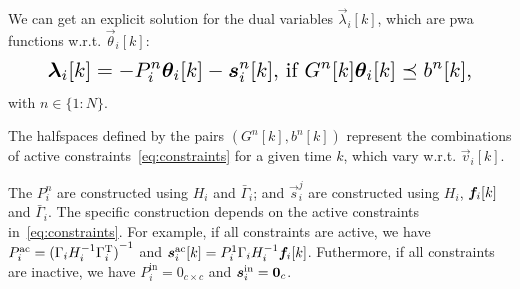 \documentclass{ifacconf}  %
\begin{document}
We can get an explicit solution for the dual variables $\vec{\lambda}_{i}[k]$, which are \acrfull{pwa} functions w.r.t. $\vec{\theta}_{i}[k]$:
\begin{equation}
\resizebox{.88\columnwidth}{!}{$
  \begin{aligned}\label{eq:lambdafuntheta}
    \lambdaik=
      -P_{i}^{n}\thetaik-\vec{s}_{i}^{n}[k]\text{, if}\ G^{n}[k]\thetaik \preceq b^{n}[k],
  \end{aligned}
  $}
\end{equation}
with $n\in\{1\mathbin{:}N\}$.

The halfspaces defined by the pairs $(G^{n}[k],b^{n}[k])$ represent the combinations of active constraints~\eqref{eq:constraints} for a given time $k$, which vary w.r.t. $\vec{v}_{i}[k]$.

The $P_{i}^{n}$ are constructed using $H_{i}$ and $\bar{\Gamma}_{i}$; and $\vec{s}_{i}^{j}$ are constructed using $H_{i}$, $\fik$ and $\bar{\Gamma}_{i}$. The specific construction depends on the active constraints in~\eqref{eq:constraints}.
For example, if all constraints are active, we have ${P_{i}^{\text{ac}}={(\relax{\Gamma}_{i}H_{i}^{-1}\relax{\Gamma}_{i}^{\mathrm{T}})}^{-1}}$ and ${\vec{s}_{i}^{\text{ac}}[k]=P_{i}^{1}\bar{\Gamma}_{i}H_{i}^{-1}\fik}$.
Futhermore, if all constraints are inactive, we have ${P_{i}^{\text{in}}=0_{c\times c}}$ and ${\boldsymbol{s}_{i}^{\text{in}}=\mathbf{0}_{c}}$.

\end{document}

